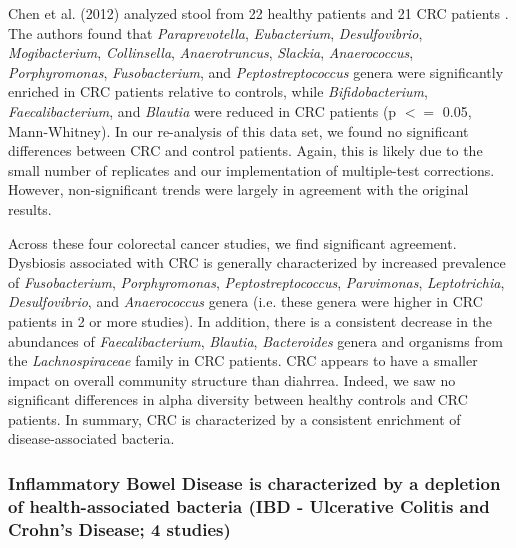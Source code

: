 Chen et al. (2012) analyzed stool from 22 healthy patients and 21 CRC patients \cite{crc-xiang}.
The authors found that \textit{Paraprevotella}, \textit{Eubacterium}, \textit{Desulfovibrio}, \textit{Mogibacterium}, \textit{Collinsella}, \textit{Anaerotruncus}, \textit{Slackia}, \textit{Anaerococcus}, \textit{Porphyromonas}, \textit{Fusobacterium}, and \textit{Peptostreptococcus} genera were significantly enriched in CRC patients relative to controls, while \textit{Bifidobacterium}, \textit{Faecalibacterium}, and \textit{Blautia} were reduced in CRC patients (p $<=$ 0.05, Mann-Whitney).
In our re-analysis of this data set, we found no significant differences between CRC and control patients.
Again, this is likely due to the small number of replicates and our implementation of multiple-test corrections.
However, non-significant trends were largely in agreement with the original results.

Across these four colorectal cancer studies, we find significant agreement.
Dysbiosis associated with CRC is generally characterized by increased prevalence of \textit{Fusobacterium}, \textit{Porphyromonas}, \textit{Peptostreptococcus}, \textit{Parvimonas}, \textit{Leptotrichia}, \textit{Desulfovibrio}, and \textit{Anaerococcus} genera (i.e. these genera were higher in CRC patients in 2 or more studies).
In addition, there is a consistent decrease in the abundances of \textit{Faecalibacterium}, \textit{Blautia}, \textit{Bacteroides} genera and organisms from the \textit{Lachnospiraceae} family in CRC patients.
CRC appears to have a smaller impact on overall community structure than diahrrea.
Indeed, we saw no significant differences in alpha diversity between healthy controls and CRC patients.
In summary, CRC is characterized by a consistent enrichment of disease-associated bacteria.

\subsubsection{Inflammatory Bowel Disease is characterized by a depletion of health-associated bacteria (IBD - Ulcerative Colitis and Crohn's Disease; 4 studies)}

